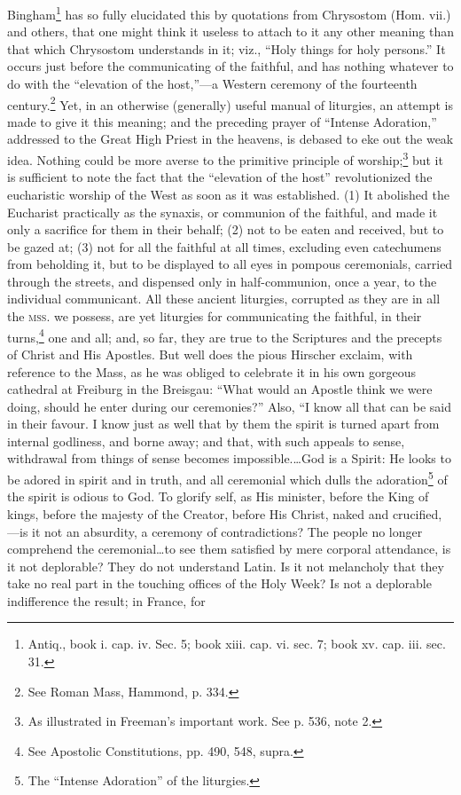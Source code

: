 Bingham\footnote{\par  Antiq., book i. cap. iv. Sec. 5; book xiii. cap. vi. sec. 7; book xv. cap. iii. sec. 31.} has so fully elucidated this by quotations from Chrysostom (Hom. vii.) and others, that one might think it useless to attach to it any other meaning than that which Chrysostom understands in it; viz., “Holy things for holy persons.” It occurs just before the communicating of the faithful, and has nothing whatever to do with the “elevation of the host,”—a Western ceremony of the fourteenth century.\footnote{\par  See Roman Mass, Hammond, p. 334.} Yet, in an otherwise (generally) useful manual of liturgies, an attempt is made to give it this meaning; and the preceding prayer of “Intense Adoration,” addressed to the Great High Priest in the heavens, is debased to eke out the weak idea. Nothing could be more averse to the primitive principle of worship;\footnote{\par  As illustrated in Freeman’s important work. See p. 536, note 2.} but it is sufficient to note the fact that the “elevation of the host” revolutionized the eucharistic worship of the West as soon as it was established. (1) It abolished the Eucharist practically as the synaxis, or communion of the faithful, and made it only a sacrifice for them in their behalf; (2) not to be eaten and received, but to be gazed at; (3) not for all the faithful at all times, excluding even catechumens from beholding it, but to be displayed to all eyes in pompous ceremonials, carried through the streets, and dispensed only in half-communion, once a year, to the individual communicant. All these ancient liturgies, corrupted as they are in all the \textsc{mss}. we possess, are yet liturgies for communicating the faithful, in their turns,\footnote{\par  See Apostolic Constitutions, pp. 490, 548, supra.} one and all; and, so far, they are true to the Scriptures and the precepts of Christ and His Apostles. But well does the pious Hirscher exclaim, with reference to the Mass, as he was obliged to celebrate it in his own gorgeous cathedral at Freiburg in the Breisgau: “What would an Apostle think we were doing, should he enter during our ceremonies?” Also, “I know all that can be said in their favour. I know just as well that by them the spirit is turned apart from internal godliness, and borne away; and that, with such appeals to sense, withdrawal from things of sense becomes impossible.…God is a Spirit: He looks to be adored in spirit and in truth, and all ceremonial which dulls the adoration\footnote{\par  The “Intense Adoration” of the liturgies.} of the spirit is odious to God. To glorify self, as His minister, before the King of kings, before the majesty of the Creator, before His Christ, naked and crucified,—is it not an absurdity, a ceremony of contradictions? The people no longer comprehend the ceremonial…to see them satisfied by mere corporal attendance, is it not deplorable? They do not understand Latin. Is it not melancholy that they take no real part in the touching offices of the Holy Week? Is not a deplorable indifference the result; in France, for 